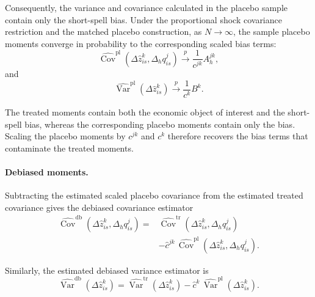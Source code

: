 \documentclass[sigconf,nonacm]{acmart}
\begin{document}
Consequently, the variance and covariance calculated in the placebo
sample contain only the short-spell bias. Under the proportional shock covariance restriction and
the matched placebo construction, as $N \to \infty$,
the sample placebo moments converge in probability
to the corresponding scaled bias terms:
\begin{equation}
\widehat{\operatorname{Cov}}^{\mathrm{pl}}\!\left(
\Delta\widehat z_{is}^{k},
\Delta_h q_{is}^{j}
\right)
\overset{p}{\longrightarrow}
\frac{1}{c^{jk}}A_h^{jk},
\label{eq:placebo_covariance}
\end{equation}
and
\begin{equation}
\widehat{\operatorname{Var}}^{\mathrm{pl}}\!\left(
\Delta\widehat z_{is}^{k}
\right)
\overset{p}{\longrightarrow}
\frac{1}{c^{k}}B^k.
\label{eq:placebo_variance}
\end{equation}

The treated moments contain both the economic object of interest and
the short-spell bias, whereas the corresponding placebo moments
contain only the bias. Scaling the placebo moments by $c^{jk}$ and $c^{k}$ therefore
recovers the bias terms that contaminate the treated moments.



\paragraph{Debiased moments.}
Subtracting the estimated scaled placebo covariance from the estimated treated covariance
gives the debiased covariance estimator
\begin{align}
\widehat{\operatorname{Cov}}^{\mathrm{db}}\!\left(
\Delta\widehat z_{is}^{k},
\Delta_h q_{is}^{j}
\right)
={}&
\widehat{\operatorname{Cov}}^{\mathrm{tr}}\!\left(
\Delta\widehat z_{is}^{k},
\Delta_h q_{is}^{j}
\right)
\nonumber\\
&-
\widehat c^{jk}\,
\widehat{\operatorname{Cov}}^{\mathrm{pl}}\!\left(
\Delta\widehat z_{is}^{k},
\Delta_h q_{is}^{j}
\right).
\label{eq:debiased_covariance}
\end{align}

Similarly, the estimated debiased variance estimator is
\begin{equation}
\widehat{\operatorname{Var}}^{\mathrm{db}}\!\left(
\Delta\widehat z_{is}^{k}
\right)
=
\widehat{\operatorname{Var}}^{\mathrm{tr}}\!\left(
\Delta\widehat z_{is}^{k}
\right)
-
\widehat c^k\,
\widehat{\operatorname{Var}}^{\mathrm{pl}}\!\left(
\Delta\widehat z_{is}^{k}
\right).
\label{eq:debiased_variance}
\end{equation}
\end{document}
